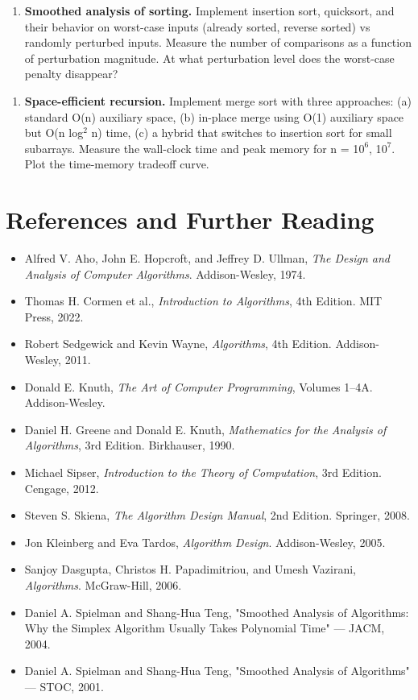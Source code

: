 \begin{enumerate}
\item \textbf{Smoothed analysis of sorting.} Implement insertion sort, quicksort, and their behavior on worst-case inputs (already sorted, reverse sorted) vs randomly perturbed inputs. Measure the number of comparisons as a function of perturbation magnitude. At what perturbation level does the worst-case penalty disappear?
\end{enumerate}

\begin{enumerate}
\item \textbf{Space-efficient recursion.} Implement merge sort with three approaches: (a) standard O(n) auxiliary space, (b) in-place merge using O(1) auxiliary space but O(n log$^{2}$ n) time, (c) a hybrid that switches to insertion sort for small subarrays. Measure the wall-clock time and peak memory for n = 1$0^{6}$, 1$0^{7}$. Plot the time-memory tradeoff curve.
\end{enumerate}

\section{References and Further Reading}

\begin{itemize}
\item Alfred V. Aho, John E. Hopcroft, and Jeffrey D. Ullman, \textit{The Design and Analysis of Computer Algorithms}. Addison-Wesley, 1974.
\item Thomas H. Cormen et al., \textit{Introduction to Algorithms}, 4th Edition. MIT Press, 2022.
\item Robert Sedgewick and Kevin Wayne, \textit{Algorithms}, 4th Edition. Addison-Wesley, 2011.
\item Donald E. Knuth, \textit{The Art of Computer Programming}, Volumes 1–4A. Addison-Wesley.
\item Daniel H. Greene and Donald E. Knuth, \textit{Mathematics for the Analysis of Algorithms}, 3rd Edition. Birkhauser, 1990.
\item Michael Sipser, \textit{Introduction to the Theory of Computation}, 3rd Edition. Cengage, 2012.
\item Steven S. Skiena, \textit{The Algorithm Design Manual}, 2nd Edition. Springer, 2008.
\item Jon Kleinberg and Eva Tardos, \textit{Algorithm Design}. Addison-Wesley, 2005.
\item Sanjoy Dasgupta, Christos H. Papadimitriou, and Umesh Vazirani, \textit{Algorithms}. McGraw-Hill, 2006.
\item Daniel A. Spielman and Shang-Hua Teng, "Smoothed Analysis of Algorithms: Why the Simplex Algorithm Usually Takes Polynomial Time" — JACM, 2004.
\item Daniel A. Spielman and Shang-Hua Teng, "Smoothed Analysis of Algorithms" — STOC, 2001.
\end{itemize}

